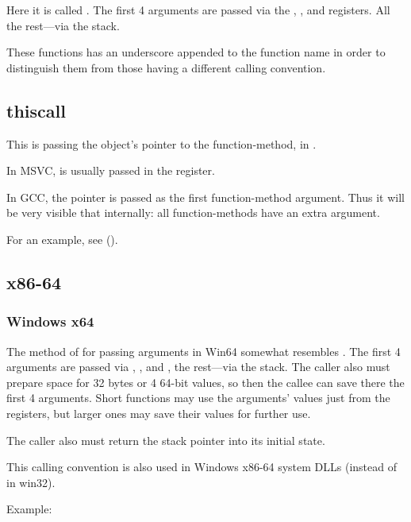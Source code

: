 Here it is called .
The first 4 arguments are passed via the \EAX, \EDX, \EBX and \ECX registers.
All the rest---via the stack.

These functions has an underscore appended to the function name in order to distinguish them from 
those having a different calling convention.

\subsection{thiscall}

This is passing the object's \ITthis pointer to the function-method, in \Cpp.

In MSVC, \ITthis is usually passed in the \ECX register.

In GCC, the \ITthis pointer is passed as the first function-method argument.
Thus it will be very visible that internally: all function-methods have an extra argument.

For an example, see ().

\subsection{x86-64}

\subsubsection{Windows x64}
\label{sec:callingconventions_win64}

The method of for passing arguments in Win64 somewhat resembles .
The first 4 arguments are passed via \RCX, \RDX,  and , the rest---via the stack.
The \gls{caller} also must prepare space for 32 bytes or 4 64-bit values,
so then the \gls{callee} can save there the first 4 arguments.
Short functions may use the arguments' values just from the registers,
but larger ones may save their values for further use.

The \gls{caller} also must return the \gls{stack pointer} into its initial state.

This calling convention is also used in Windows x86-64 system DLLs 
(instead of  in win32).

Example:





